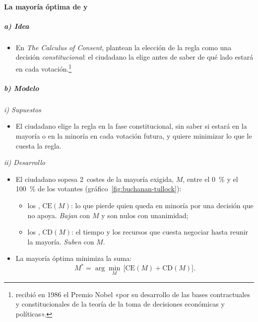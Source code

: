\documentclass[11pt]{article}
\begin{document}
\paragraph{La mayoría óptima de  y }

\subparagraph{a) Idea}

\begin{itemize}
\item En \emph{The Calculus of Consent}, \textcite{BuchananTullock1962Calculus} plantean la elección de la regla como una decisión \emph{constitucional}: el ciudadano la elige antes de saber de qué lado estará en cada votación.\footnote{ recibió en 1986 el Premio Nobel «por su desarrollo de las bases contractuales y constitucionales de la teoría de la toma de decisiones económicas y políticas»\nocite{Nobel1986Buchanan}.}
\end{itemize}

\subparagraph{b) Modelo}

\hspace*{3.6em}\emph{i) Supuestos}

\begin{itemize}
\item El ciudadano elige la regla en la fase constitucional, sin saber si estará en la mayoría o en la minoría en cada votación futura, y quiere minimizar lo que le cuesta la regla.
\end{itemize}

\hspace*{3.6em}\emph{ii) Desarrollo}

\begin{itemize}
\item El ciudadano sopesa 2~costes de la mayoría exigida, $M$, entre el 0~\% y el 100~\% de los votantes (gráfico~\ref{fig:buchanan-tullock}):
  \begin{itemize}
  \item los , $\mathrm{CE}(M)$: lo que pierde quien queda en minoría por una decisión que no apoya. \emph{Bajan} con $M$ y son nulos con unanimidad;
  \item los , $\mathrm{CD}(M)$: el tiempo y los recursos que cuesta negociar hasta reunir la mayoría. \emph{Suben} con $M$.
  \end{itemize}
\item La mayoría óptima minimiza la suma:
  \begin{equation}\label{eq:mayoria-optima}
  M^*=\arg\min_M\,\big[\mathrm{CE}(M)+\mathrm{CD}(M)\big].
  \end{equation}
\end{itemize}
\end{document}
